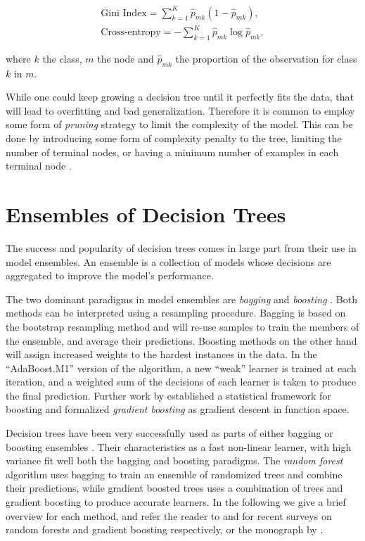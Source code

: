 \begin{equation}
	\begin{split}
		\text{Gini Index} = \sum_{k=1}^K\hat{p}_{mk}(1 - \hat{p}_{mk}), \\
		\text{Cross-entropy} = -\sum_{k=1}^K\hat{p}_{mk} \log{\hat{p}_{mk}},
	\end{split}
\end{equation}

where $k$ the class, $m$ the node and $\hat{p}_{mk}$ the proportion of
the observation for class $k$ in $m$.

While one could keep growing a decision tree until it perfectly fits the data,
that will lead to overfitting and bad generalization. Therefore
it is common to employ some form of \emph{pruning} strategy to limit the
complexity of the model. This can be done by introducing some
form of complexity penalty to the tree, limiting the number of terminal
nodes, or having a minimum number of examples in each terminal node
\cite{breiman1984cart}.


\section{Ensembles of Decision Trees}
\label{sec:bg-dt-ensembles}

The success and popularity of decision trees comes in large part
from their use in model ensembles. An ensemble is a collection
of models whose decisions are aggregated to improve the model's
performance.

The two dominant paradigms in model ensembles are \emph{bagging} \cite{bagging} and
\emph{boosting} \cite{boosting-schapire, boosting-freund-schapire}. Both
methods can be interpreted using a resampling procedure. Bagging is
based on the bootstrap \cite{bootstrap} resampling method and will re-use samples
to train the members of the ensemble, and average their predictions.
Boosting methods on the other hand will assign increased weights to the
hardest instances in the data. In the ``AdaBoost.M1'' version of the algorithm,
a new ``weak'' learner is trained at each iteration, and a weighted sum of
the decisions of each learner is taken to produce the final prediction.
Further work by \citet{gradient-boosting-breiman} established a statistical framework
for boosting and formalized \emph{gradient boosting} as gradient descent in function
space.

Decision trees have been very successfully used as parts of either bagging
or boosting ensembles \cite{hundreds-classifiers}. Their characteristics as a fast non-linear learner,
with high variance fit well both the bagging and boosting paradigms.
The \emph{random forest} algorithm uses bagging to train an ensemble
of randomized trees and combine their predictions, while gradient boosted trees
uses a combination of trees and gradient boosting to produce
accurate learners. In the following we give a brief overview for each method,
and refer the reader to \cite{random-forest-survey} and \cite{biau-optimization} for recent surveys on
random forests and gradient boosting respectively, or the monograph by \citet{esl}.

